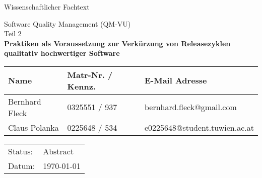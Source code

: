 \begin{titlepage}
\sffamily

{ \Large Wissenschaftlicher Fachtext} \\[3cm]
	
\begin{flushright}
	{ \Large
	Software Quality Management (QM-VU) \\
	Teil 2 \\[2cm]
	\bfseries
	\LARGE
	Praktiken als Voraussetzung zur Verkürzung von Releasezyklen qualitativ hochwertiger Software}
\end{flushright}
\vfill
\begin{center}
\begin{tabular}{lll}
	\toprule
	\textbf{Name} & \textbf{Matr-Nr. / Kennz.} & \textbf{E-Mail Adresse} \\
	\midrule
	Bernhard Fleck & 0325551 / 937 & bernhard.fleck@gmail.com \\
	\addlinespace
	Claus Polanka & 0225648 / 534 & e0225648@student.tuwien.ac.at \\
	\bottomrule
\end{tabular}
\end{center}
\begin{tabular}{ll}
	Status: & Abstract \\
	Datum: & \today
\end{tabular}
\end{titlepage}